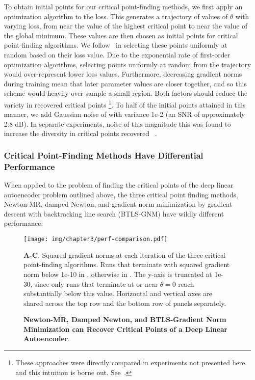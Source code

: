 \documentclass[../../thesis.tex]{subfiles}
\begin{document}
To obtain initial points for our critical point-finding methods,
we first apply an optimization algorithm to the loss.
This generates a trajectory of values of $\theta$ with varying loss,
from near the value of the highest critical point
to near the value of the global minimum.
These values are then chosen as initial points
for critical point-finding algorithms.
We follow~\cite{pennington2017} in selecting these points
uniformly at random based on their loss value.
Due to the exponential rate of first-order optimization algorithms,
selecting points uniformly at random from the trajectory
would over-represent lower loss values.
Furthermore, decreasing gradient norms during training mean that
later parameter values are closer together,
and so this scheme would heavily over-sample a small region.
Both factors should reduce the variety in recovered critical points%
\footnote{These approaches were directly compared in
experiments not presented here and this intuition is borne out.
See~\cite{frye2019}.}.
To half of the initial points attained in this manner,
we add Gaussian noise of with variance 1e-2
(an SNR of approximately 2.8 dB).
In separate experiments,
noise of this magnitude
this was found to increase
the diversity in critical points recovered%
~\cite{frye2019}.

\subsubsection{Critical Point-Finding Methods Have Differential Performance}%

When applied to the problem of finding the critical points
of the deep linear autoencoder problem outlined above,
the three critical point finding methods,
Newton-MR, damped Newton, and
gradient norm minimization by gradient descent with backtracking line search
(BTLS-GNM)
have wildly different performance.

\begin{figure}[h]
	\begin{center}
		\texttt{[image: img/chapter3/perf-comparison.pdf]}
	\end{center}
	\caption{\textbf{Newton-MR, Damped Newton, and BTLS-Gradient Norm Minimization
	can Recover Critical Points of a Deep Linear Autoencoder}.}{%
		\textbf{A-C}. Squared gradient norms at each iteration
		of the three critical point-finding algorithms.
		Runs that terminate with squared gradient norm below 1e-10
		in \successcolor{},
		otherwise in \failcolor{}.
		The y-axis is truncated at 1e-30,
		since only runs that terminate at or near $\theta=0$
		reach substantially below this value.
		Horizontal and vertical axes are shared across
		the top row and the bottom row of panels separately.
	}
\end{figure}
\end{document}

